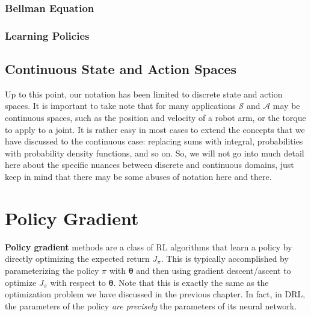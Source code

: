 \documentclass[12pt]{report}
\theoremstyle{definition}
\theoremstyle{remark}
\begin{document}
\subsubsection{Bellman Equation}

\subsubsection{Learning Policies}

\subsection{Continuous State and Action Spaces}
Up to this point, our notation has been limited to discrete state and action spaces. It is important to take note that for many applications $\mathcal{S}$ and $\mathcal{A}$ may be continuous spaces, such as the position and velocity of a robot arm, or the torque to apply to a joint. It is rather easy in most cases to extend the concepts that we have discussed to the continuous case: replacing sums with integral, probabilities with probability density functions, and so on. So, we will not go into much detail here about the specific nuances between discrete and continuous domains, just keep in mind that there may be some abuses of notation here and there.

\section{Policy Gradient}
\textbf{Policy gradient} methods are a class of RL algorithms that learn a policy by directly optimizing the expected return $J_\pi$. This is typically accomplished by parameterizing the policy $\pi$ with $\boldsymbol{\theta}$ and then using gradient descent/ascent to optimize $J_\pi$ with respect to $\boldsymbol{\theta}$. Note that this is exactly the same as the optimization problem we have discussed in the previous chapter. In fact, in DRL, the parameters of the policy \textit{are precisely} the parameters of its neural network.
\end{document}
